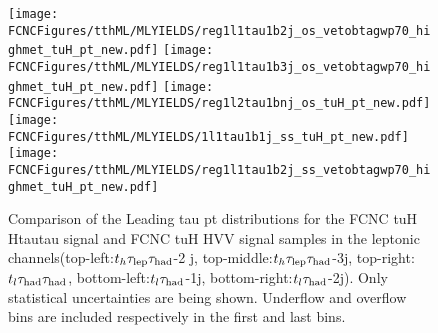 \begin{figure}[htb]
  \centering
  \texttt{[image: \\FCNCFigures/tthML/MLYIELDS/reg1l1tau1b2j\_os\_vetobtagwp70\_highmet\_tuH\_pt\_new.pdf]}
  \texttt{[image: \\FCNCFigures/tthML/MLYIELDS/reg1l1tau1b3j\_os\_vetobtagwp70\_highmet\_tuH\_pt\_new.pdf]}
  \texttt{[image: \\FCNCFigures/tthML/MLYIELDS/reg1l2tau1bnj\_os\_tuH\_pt\_new.pdf]}
  \\
  \texttt{[image: \\FCNCFigures/tthML/MLYIELDS/1l1tau1b1j\_ss\_tuH\_pt\_new.pdf]}
  \texttt{[image: \\FCNCFigures/tthML/MLYIELDS/reg1l1tau1b2j\_ss\_vetobtagwp70\_highmet\_tuH\_pt\_new.pdf]}
\\
\caption{ Comparison of the Leading tau pt distributions for the FCNC tuH Htautau signal and FCNC tuH HVV signal samples in the leptonic channels(top-left:$t_h\tau_\text{lep}{}\tau_\text{had}$-2
j, top-middle:$t_h\tau_\text{lep}{}\tau_\text{had}$-3j, top-right:$t_l\tau_\text{had}{}\tau_\text{had}$, bottom-left:$t_l\tau_\text{had}$-1j, bottom-right:$t_l\tau_\text{had}$-2j). Only statistical uncertainties are being shown. Underflow and overflow bins are included respectively in the first and last bins.}
\label{fig:check_tuH_HWW}
\end{figure}



